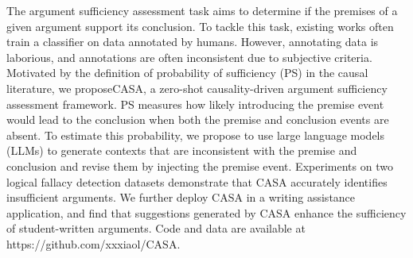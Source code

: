 The argument sufficiency assessment task aims to determine if the premises of a given argument support its conclusion. To tackle this task, existing works often train a classifier on data annotated by humans. However, annotating data is laborious, and annotations are often inconsistent due to subjective criteria. Motivated by the definition of probability of sufficiency (PS) in the causal literature, we proposeCASA, a zero-shot causality-driven argument sufficiency assessment framework.  PS measures how likely introducing the premise event would lead to the conclusion when both the premise and conclusion events are absent. To estimate this probability, we propose to use large language models (LLMs) to generate contexts that are inconsistent with the premise and conclusion and revise them by injecting the premise event. Experiments on two logical fallacy detection datasets demonstrate that CASA accurately identifies insufficient arguments. We further deploy CASA in a writing assistance application, and find that suggestions generated by CASA enhance the sufficiency of student-written arguments. Code and data are available at https://github.com/xxxiaol/CASA.